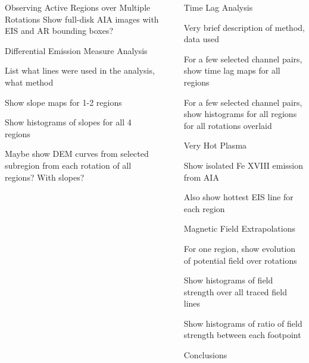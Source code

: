 \documentclass[final]{beamer}
\newlength{\sepwidth}
\newlength{\colwidth}
\newcommand{\separatorcolumn}{\begin{column}{\sepwidth}\end{column}}
\begin{document}
\begin{frame}[t]
\begin{columns}[t]
\begin{column}{\colwidth}
\begin{block}{Observing Active Regions over Multiple Rotations}
    Show full-disk AIA images with EIS and AR bounding boxes?

  \end{block}

  \begin{block}{Differential Emission Measure Analysis}

    List what lines were used in the analysis, what method

    Show slope maps for 1-2 regions

    Show histograms of slopes for all 4 regions

    Maybe show DEM curves from selected subregion from each rotation of all regions? With slopes?

  \end{block}

\end{column}

\separatorcolumn

\begin{column}{\colwidth}

  \begin{block}{Time Lag Analysis}

    Very brief description of method, data used

    For a few selected channel pairs, show time lag maps for all regions

    For a few selected channel pairs, show histograms for all regions for all rotations overlaid

  \end{block}

  \begin{block}{Very Hot Plasma}
    
    Show isolated Fe XVIII emission from AIA

    Also show hottest EIS line for each region

  \end{block}

  \begin{block}{Magnetic Field Extrapolations}

    For one region, show evolution of potential field over rotations

    Show histograms of field strength over all traced field lines

    Show histograms of ratio of field strength between each footpoint

  \end{block}

  \begin{block}{Conclusions}


\end{block}
\end{column}
\end{columns}
\end{frame}
\end{document}
